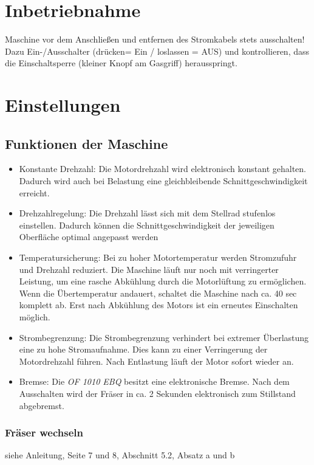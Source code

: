 \documentclass{\basedir/fablab-document}
\begin{document}
\section{Inbetriebnahme}
Maschine vor dem Anschließen und entfernen des Stromkabels stets ausschalten! Dazu Ein-/Ausschalter (drücken= Ein / loslassen = AUS) und kontrollieren, dass die Einschaltsperre (kleiner Knopf am Gasgriff) herausspringt.

\section{Einstellungen}
\subsection{Funktionen der Maschine}
\begin{itemize}
\item Konstante Drehzahl: Die Motordrehzahl wird elektronisch konstant gehalten. Dadurch wird auch bei Belastung eine gleichbleibende Schnittgeschwindigkeit erreicht.
\item Drehzahlregelung: Die Drehzahl lässt sich mit dem Stellrad stufenlos einstellen. Dadurch können die Schnittgeschwindigkeit der jeweiligen Oberfläche optimal angepasst werden 
\item Temperatursicherung: Bei zu hoher Motortemperatur werden Stromzufuhr und Drehzahl reduziert. Die Maschine läuft nur noch mit verringerter Leistung, um eine rasche Abkühlung durch die Motorlüftung zu ermöglichen. Wenn die Übertemperatur andauert, schaltet die Maschine nach ca. 40 sec komplett ab. Erst nach Abkühlung des Motors ist ein erneutes Einschalten möglich.
\item Strombegrenzung: Die Strombegrenzung verhindert bei extremer Überlastung eine zu hohe Stromaufnahme. Dies kann zu einer Verringerung der Motordrehzahl führen. Nach Entlastung läuft der Motor sofort wieder an.
\item Bremse: Die \textit{OF 1010 EBQ} besitzt eine elektronische Bremse. Nach dem Ausschalten wird der Fräser in ca. 2 Sekunden elektronisch zum Stillstand abgebremst.
\end{itemize}

\subsubsection{Fräser wechseln}
siehe Anleitung, Seite 7 und 8, Abschnitt 5.2, Absatz a und b
\end{document}
